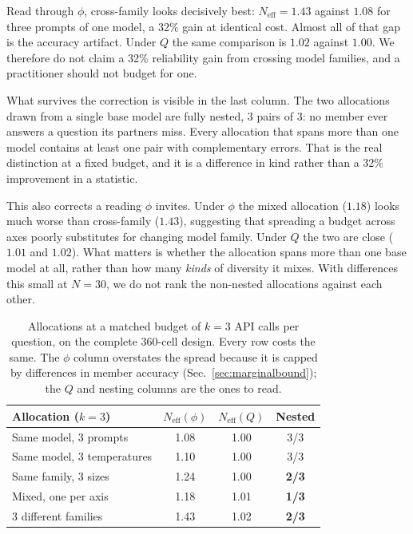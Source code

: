 \documentclass[conference]{IEEEtran}
\begin{document}
Read through $\phi$, cross-family looks decisively best: $N_\text{eff}=1.43$
against $1.08$ for three prompts of one model, a 32\% gain at identical cost.
Almost all of that gap is the accuracy artifact. Under $Q$ the same
comparison is $1.02$ against $1.00$. We therefore do not claim a 32\%
reliability gain from crossing model families, and a practitioner should not
budget for one.

What survives the correction is visible in the last column. The two
allocations drawn from a single base model are fully nested, 3 pairs of 3:
no member ever answers a question its partners miss. Every allocation that
spans more than one model contains at least one pair with complementary
errors. That is the real distinction at a fixed budget, and it is a
difference in kind rather than a 32\% improvement in a statistic.

This also corrects a reading $\phi$ invites. Under $\phi$ the mixed
allocation ($1.18$) looks much worse than cross-family ($1.43$), suggesting
that spreading a budget across axes poorly substitutes for changing model
family. Under $Q$ the two are close ($1.01$ and $1.02$). What matters is
whether the allocation spans more than one base model at all, rather than how
many \emph{kinds} of diversity it mixes. With differences this small at
$N=30$, we do not rank the non-nested allocations against each other.

\begin{table}[!htb]
\centering
\caption{Allocations at a matched budget of $k=3$ API calls per question, on the complete 360-cell design. Every row costs the same. The $\phi$ column overstates the spread because it is capped by differences in member accuracy (Sec.~\ref{sec:marginalbound}); the $Q$ and nesting columns are the ones to read.}
\label{tab:budget}
\begin{tabular}{lccc}
\toprule
Allocation ($k=3$) & $N_\text{eff}(\phi)$ & $N_\text{eff}(Q)$ & Nested \\
\midrule
Same model, 3 prompts & 1.08 & 1.00 & 3/3 \\
Same model, 3 temperatures & 1.10 & 1.00 & 3/3 \\
Same family, 3 sizes & 1.24 & 1.00 & \textbf{2/3} \\
\midrule
Mixed, one per axis & 1.18 & 1.01 & \textbf{1/3} \\
3 different families & 1.43 & 1.02 & \textbf{2/3} \\
\bottomrule
\end{tabular}
\end{table}
\end{document}
